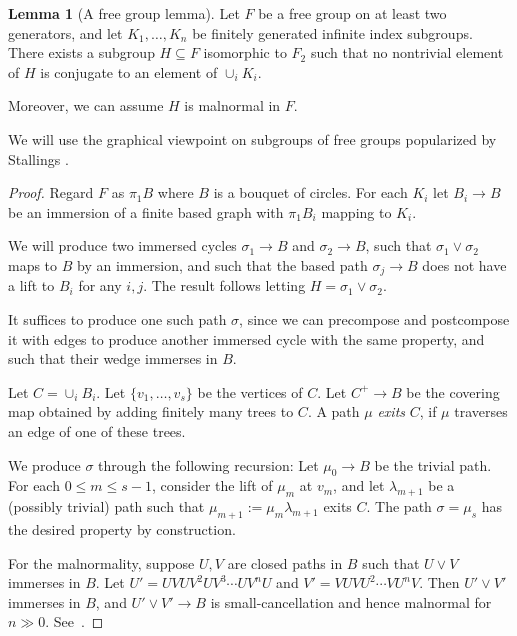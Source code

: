 \documentclass[12pt,oneside]{amsart}
\theoremstyle{definition}
\newtheorem{lem}[thm]{Lemma}
\theoremstyle{definition}
\theoremstyle{remark}
\begin{document}
\begin{lem}[A free group lemma]\label{lem:nonconjugate}
    Let $F$ be a free group on at least two generators, and let $K_1, \dots, K_n$ be finitely generated infinite index subgroups. There exists a subgroup $H\subseteq F$ isomorphic to $F_2$ such that no nontrivial element of $H$ is conjugate to an element of $\cup_i K_i$.

    Moreover, we can assume $H$ is malnormal in $F$.
    \end{lem}

    
We will use the graphical viewpoint on subgroups of free groups
popularized by Stallings \cite{Stallings83}.


\begin{proof}
Regard $F$ as $\pi_1B$ where $B$ is a bouquet of circles.
For each $K_i$ let $B_i\rightarrow B$ be an immersion of a finite based graph
with $\pi_1B_i$ mapping to $K_i$.

We will produce two immersed cycles $\sigma_1\rightarrow B$
and $\sigma_2\rightarrow B$,
such that $\sigma_1\vee \sigma_2$ maps to $B$ by an immersion,
and such that the based path $\sigma_j\rightarrow B$ does not have a lift to $B_i$ for any $i,j$.
The result follows letting $H=\sigma_1\vee \sigma_2$.

It suffices to produce one such path $\sigma$,
since we can precompose and postcompose it with edges to produce another immersed cycle with the same property, and such that their wedge immerses in $B$.

Let $C=\cup_i B_i$.
Let $\{v_1,\ldots, v_s\}$ be the vertices of $C$.
Let $C^+\rightarrow B$ be the covering map obtained by adding finitely many trees to $C$.
A path $\mu$ \emph{exits} $C$, if $\mu$ traverses an edge of one of these trees.

We produce $\sigma$ through the following recursion:
Let $\mu_0\rightarrow B$ be the trivial path.
For each $0\leq m \leq s-1$,
consider the lift of $\mu_m$ at $v_m$, and let $\lambda_{m+1}$
be a (possibly trivial) path such that $\mu_{m+1}:=\mu_m\lambda_{m+1}$ exits $C$.
The path $\sigma=\mu_s$ has the desired property by construction.

For the malnormality, suppose $U,V$ are closed paths in $B$
such that $U\vee V$ immerses in $B$.
Let $U'=UVUV^2UV^3\cdots U V^nU$
and $V'=VUVU^2\cdots VU^n V $.
Then $U'\vee V'$ immerses in $B$,
and $U'\vee V' \rightarrow B$ is small-cancellation and hence malnormal
for $n\gg 0$. See~\cite[Thm~2.14]{WisePositive}.
\end{proof}
\end{document}
